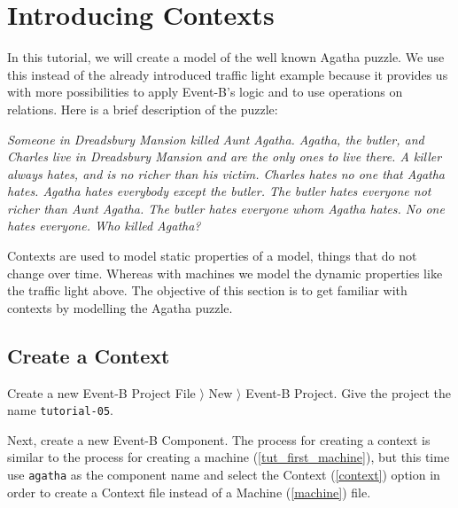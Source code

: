 \section{Introducing Contexts}
\label{tut_contexts}


In this tutorial, we will create a model of the well known Agatha puzzle. 
We use this instead of the already introduced traffic light example because it provides us
 with more possibilities to apply Event-B's logic and to use operations on relations.
Here is a brief description of the puzzle:

\textit{Someone in Dreadsbury Mansion killed Aunt Agatha. Agatha, the butler, and Charles live in Dreadsbury Mansion and are the only ones to live there. A killer always hates, and is no richer than his victim. Charles hates no one that Agatha hates. Agatha hates everybody except the butler. The butler hates everyone not richer than Aunt Agatha. The butler hates everyone whom Agatha hates. No one hates everyone. Who killed Agatha?}

Contexts are used to model static properties of a model, things that do not change over time. Whereas with machines we model the dynamic properties like the traffic light above.
The objective of this section is to get familiar with contexts by modelling the Agatha puzzle.

\subsection{Create a Context}
\label{tut_create_context}

Create a new Event-B Project \textsf{File $\rangle$ New $\rangle$ Event-B Project}. Give the project the name \texttt{tutorial-05}. 

Next, create a new Event-B Component. The process for creating a context is similar to the process for creating a machine (\ref{tut_first_machine}), but this time use \texttt{agatha} as the component name and select the \textsf{Context} (\ref{context}) option in order to create a Context file instead of a Machine (\ref{machine}) file.


